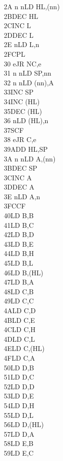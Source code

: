 \documentclass[twoside,openright,a4paper]{book}
\begin{document}
\begin{multicols}{3}
{\begin{tabbing}
	2A n n\>LD HL,(nn)\\
	2B\>DEC HL\\
	2C\>INC L\\
	2D\>DEC L\\
	2E n\>LD L,n\\
	2F\>CPL\\
	30 e\>JR NC,e\\
	31 n n\>LD SP,nn\\
	32 n n\>LD (nn),A\\
	33\>INC SP\\
	34\>INC (HL)\\
	35\>DEC (HL)\\
	36 n\>LD (HL),n\\
	37\>SCF\\
	38 e\>JR C,e\\
	39\>ADD HL,SP\\
	3A n n\>LD A,(nn)\\
	3B\>DEC SP\\
	3C\>INC A\\
	3D\>DEC A\\
	3E n\>LD A,n\\
	3F\>CCF\\
	40\>LD B,B\\
	41\>LD B,C\\
	42\>LD B,D\\
	43\>LD B,E\\
	44\>LD B,H\\
	45\>LD B,L\\
	46\>LD B,(HL)\\
	47\>LD B,A\\
	48\>LD C,B\\
	49\>LD C,C\\
	4A\>LD C,D\\
	4B\>LD C,E\\
	4C\>LD C,H\\
	4D\>LD C,L\\
	4E\>LD C,(HL)\\
	4F\>LD C,A\\
	50\>LD D,B\\
	51\>LD D,C\\
	52\>LD D,D\\
	53\>LD D,E\\
	54\>LD D,H\\
	55\>LD D,L\\
	56\>LD D,(HL)\\
	57\>LD D,A\\
	58\>LD E,B\\
	59\>LD E,C\\

\end{tabbing}}
\end{multicols}
\end{document}
